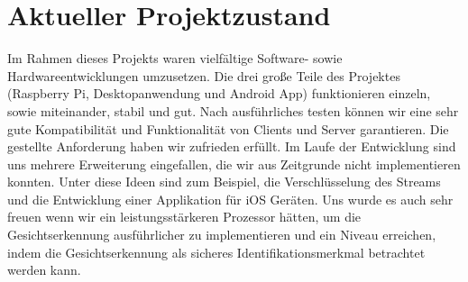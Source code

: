 
\chapter{Aktueller Projektzustand}


Im Rahmen dieses Projekts waren vielfältige Software- sowie Hardwareentwicklungen umzusetzen. Die drei große Teile des Projektes (Raspberry Pi, Desktopanwendung und Android App) funktionieren einzeln, sowie miteinander, stabil und gut. Nach ausführliches testen können wir eine sehr gute Kompatibilität und Funktionalität von Clients und Server garantieren. Die gestellte Anforderung haben wir zufrieden erfüllt. Im Laufe der Entwicklung sind uns mehrere Erweiterung eingefallen, die wir aus Zeitgrunde nicht implementieren konnten. Unter diese Ideen sind zum Beispiel, die Verschlüsselung des Streams und die Entwicklung einer Applikation für iOS Geräten. Uns wurde es auch sehr freuen wenn wir ein leistungsstärkeren Prozessor hätten, um die Gesichtserkennung ausführlicher zu implementieren und ein Niveau erreichen, indem die Gesichtserkennung als sicheres Identifikationsmerkmal betrachtet werden kann.
